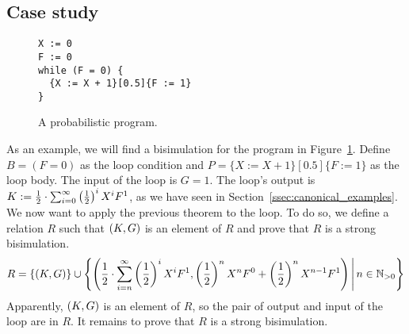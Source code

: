 \subsection*{Case study}
\begin{figure}[t]
	\begin{lstlisting}[label=prg:canonical3, caption=Canonical example]
X := 0
F := 0
while (F = 0) {
  {X := X + 1}[0.5]{F := 1}
}
	\end{lstlisting}
	\caption{A probabilistic program. \label{fig:canonical}}
\end{figure}
As an example, we will find a bisimulation for the program in Figure~\ref{fig:canonical}.
Define $B = ( F = 0 )$ as the loop condition and $P = \{X := X + 1\}[0.5]\{F := 1\}$ as the loop body.
The input of the loop is $G = 1$.
The loop's output is $K := \frac{1}{2} \cdot \sum_{i=0}^\infty \left( \frac{1}{2} \right)^i X^{i} F^1$, as we have seen in Section~\ref{ssec:canonical_examples}.
We now want to apply the previous theorem to the loop.
To do so, we define a relation $R$ such that $\left( K, G \right)$ is an element of $R$ and prove that $R$ is a strong bisimulation.
\[
	R = \{ (K, G) \} \cup \left\{ \left(  \frac{1}{2} \cdot \sum_{i=n}^\infty \left( \frac{1}{2} \right)^i X^i F^1 ,
	  	\left( \frac{1}{2} \right)^n X^n F^0 + \left( \frac{1}{2} \right)^n X^{n-1} F^1  \right)
		\, \middle|\, n \in \mathbb{N}_{>0} \right\}
\]
Apparently, $\left( K, G \right)$ is an element of $R$, so the pair of output and input of the loop are in $R$.
It remains to prove that $R$ is a strong bisimulation.
